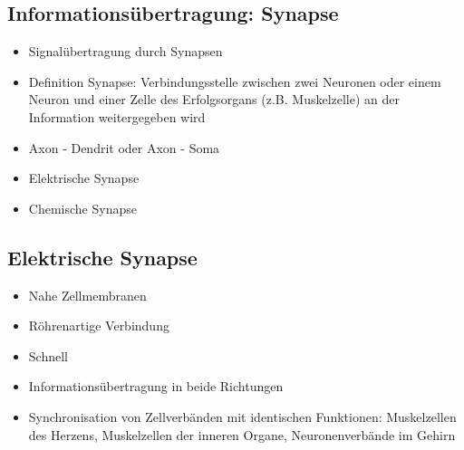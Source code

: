 \documentclass[a4paper,10pt,oneside]{article}
\begin{document}
\subsection{Informationsübertragung: Synapse}
\begin{itemize}
	\item Signalübertragung durch Synapsen
	\item Definition Synapse: Verbindungsstelle zwischen zwei Neuronen oder einem Neuron und einer Zelle des Erfolgsorgans (z.B. Muskelzelle) an der Information weitergegeben wird
	\item Axon - Dendrit oder Axon - Soma
	\item Elektrische Synapse
	\item Chemische Synapse
\end{itemize}

\subsection{Elektrische Synapse}
\begin{itemize}
	\item Nahe Zellmembranen
	\item Röhrenartige Verbindung
	\item Schnell
	\item Informationsübertragung in beide Richtungen
	\item Synchronisation von Zellverbänden mit identischen Funktionen: Muskelzellen des Herzens, Muskelzellen der inneren Organe, Neuronenverbände im Gehirn
\end{itemize}
\end{document}
